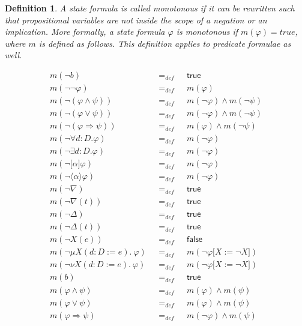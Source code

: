 \documentclass{article}
\newtheorem{definition}[theorem]{Definition}
\begin{document}
\begin{definition}
A state formula is called \emph{monotonous} if it can be rewritten such that
propositional variables are not inside the scope of a negation or an
implication. More formally, a state formula $\varphi $ is monotonous if $%
m(\varphi )=true$, where $m$ is defined as follows. This definition applies
to predicate formulae as well.
\end{definition}

\begin{equation*}
\begin{array}{lll}
m(\lnot b) & =_{def} & \mathsf{true} \\
m(\lnot \lnot \varphi ) & =_{def} & m(\varphi ) \\
m(\lnot (\varphi \wedge \psi )) & =_{def} & m(\lnot \varphi )\wedge m(\lnot
\psi ) \\
m(\lnot (\varphi \vee \psi )) & =_{def} & m(\lnot \varphi )\wedge m(\lnot
\psi ) \\
m(\lnot (\varphi \Rightarrow \psi )) & =_{def} & m(\varphi )\wedge m(\lnot
\psi ) \\
m(\lnot \forall d{{:}D}.\varphi ) & =_{def} & m(\lnot \varphi ) \\
m(\lnot \exists d{{:}D}.\varphi ) & =_{def} & m(\lnot \varphi ) \\
m(\lnot \lbrack \alpha ]\varphi ) & =_{def} & m(\lnot \varphi ) \\
m(\lnot \langle \alpha \rangle \varphi ) & =_{def} & m(\lnot \varphi ) \\
m(\lnot \nabla ) & =_{def} & \mathsf{true} \\
m(\lnot \nabla (t)) & =_{def} & \mathsf{true} \\
m(\lnot \Delta ) & =_{def} & \mathsf{true} \\
m(\lnot \Delta (t)) & =_{def} & \mathsf{true} \\
m(\lnot X(e)) & =_{def} & \mathsf{false} \\
m(\lnot \mu X(d{:}D:=e).~\varphi )~~~ & =_{def}~~~ & m(\lnot \varphi \lbrack
X:=\lnot X]) \\
m(\lnot \nu X(d{:}D:=e).~\varphi )~~~ & =_{def}~~~ & m(\lnot \varphi \lbrack
X:=\lnot X]) \\
m(b) & =_{def} & \mathsf{true} \\
m(\varphi \wedge \psi ) & =_{def} & m(\varphi )\wedge m(\psi ) \\
m(\varphi \vee \psi ) & =_{def} & m(\varphi )\wedge m(\psi ) \\
m(\varphi \Rightarrow \psi ) & =_{def} & m(\lnot \varphi )\wedge m(\psi ) \\

\end{array}
\end{equation*}
\end{document}
